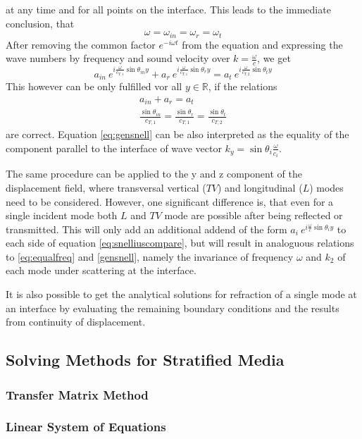 at any time and for all points on the interface. This leads to the immediate
conclusion, that
\begin{equation} \label{eq:equalfreq}
    \omega = \omega_{in} = \omega_r = \omega_t
\end{equation}
After removing the common factor $e^{-i\omega t}$ from the equation and
expressing the wave numbers by frequency and sound velocity over
$k = \frac{\omega}{c}$, we get
\begin{equation} \label{eq:snelliuscompare}
    a_{in}\ e^{i \frac{ \omega}{c_{T,1}}\sin\theta_{in} y}
    + a_{r}\ e^{i \frac{ \omega}{c_{T,1}}\sin\theta_{r} y}
    = a_{t}\ e^{i \frac{ \omega}{c_{T,2}}\sin\theta_{t} y}
\end{equation}
This however can be only fulfilled vor all $y \in \mathbb{R}$, if the relations
\begin{align}
    a_{in} + a_r = a_t \\
    \frac{\sin\theta_{in}}{c_{T,1}} = \frac{\sin\theta_{r}}{c_{T,1}} =
    \frac{\sin\theta_{t}}{c_{T,2}} \label{eq:gensnell}
\end{align}
are correct. Equation \ref{eq:gensnell} can be also interpreted as the equality
of the component parallel to the interface of wave vector
$k_y=\sin\theta_i \frac{\omega}{c_i}$.

The same procedure can be applied to the y and z component of the displacement
field, where transversal vertical ($TV$) and longitudinal ($L$) modes need to
be considered. However, one significant difference is, that even for a single
incident mode both $L$ and $TV$ mode are possible after being reflected or
transmitted. This will only add an additional addend of the form
$ a_{i}\ e^{i \frac{ \omega}{c}\sin\theta_{i} y}$ to each side of equation
\ref{eq:snelliuscompare}, but will result in analoguous relations to
\ref{eq:equalfreq} and \ref{gensnell}, namely the invariance of frequency
$\omega$ and $k_2$ of each mode under scattering at the interface.

It is also possible to get the analytical solutions for refraction of a single
mode at an interface by evaluating the remaining boundary conditions and the
results from continuity of displacement.


\subsection{Solving Methods for Stratified Media}

\subsubsection{Transfer Matrix Method}

\subsubsection{Linear System of Equations}